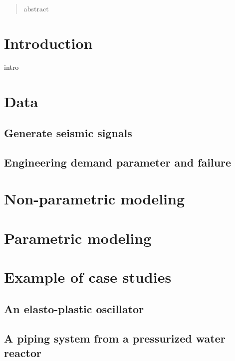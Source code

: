 

\begin{abstract}
    abstract
\end{abstract}

\minitoc


\section{Introduction}


intro

\section{Data}

\subsection{Generate seismic signals}

\subsection{Engineering demand parameter and failure}



\section{Non-parametric modeling}




\section{Parametric modeling}





\section{Example of case studies}

    \subsection{An elasto-plastic oscillator}
    
    \subsection{A piping system from a pressurized water reactor}

